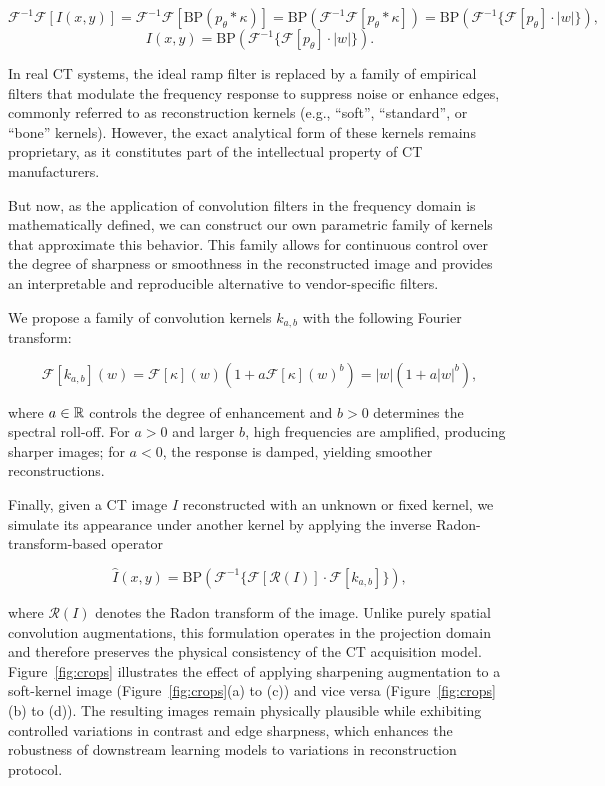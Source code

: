 \[
\mathcal{F}^{-1}\mathcal{F}[I(x, y)] = \mathcal{F}^{-1}\mathcal{F}[\text{BP}(p_\theta * \kappa)] = \text{BP}(\mathcal{F}^{-1}\mathcal{F}[p_\theta * \kappa]) = \text{BP}(\mathcal{F}^{-1}\{\mathcal{F}[p_\theta]\cdot|w|\}),\]
\[I(x, y) = \text{BP}\left(\mathcal{F}^{-1}\{\mathcal{F}[p_\theta]\cdot|w|\}\right).\]

In real CT systems, the ideal ramp filter is replaced by a family of empirical filters that modulate the frequency response to suppress noise or enhance edges, commonly referred to as reconstruction kernels (e.g., ``soft'', ``standard'', or ``bone'' kernels). However, the exact analytical form of these kernels remains proprietary, as it constitutes part of the intellectual property of CT manufacturers.

But now, as the application of convolution filters in the frequency domain is mathematically defined, we can construct our own parametric family of kernels that approximate this behavior. This family allows for continuous control over the degree of sharpness or smoothness in the reconstructed image and provides an interpretable and reproducible alternative to vendor-specific filters.

We propose a family of convolution kernels $k_{a,b}$ with the following Fourier transform:

\[\mathcal{F}[k_{a,b}](w) = \mathcal{F}[\kappa](w)(1 + a \mathcal{F}[\kappa](w)^b) = |w|(1 + a|w|^b),\]

\noindent
where $a \in \mathbb{R}$ controls the degree of enhancement and $b > 0$ determines the spectral roll-off. For $a > 0$ and larger $b$, high frequencies are amplified, producing sharper images; for $a < 0$, the response is damped, yielding smoother reconstructions.

Finally, given a CT image $I$ reconstructed with an unknown or fixed kernel, we simulate its appearance under another kernel by applying the inverse Radon-transform-based operator

\[\hat{I}(x, y) = \text{BP}\left(\mathcal{F}^{-1}\{\mathcal{F}[\mathcal{R}(I)]\cdot\mathcal{F}[k_{a,b}]\}\right),\]

\noindent
where $\mathcal{R}(I)$ denotes the Radon transform of the image. Unlike purely spatial convolution augmentations, this formulation operates in the projection domain and therefore preserves the physical consistency of the CT acquisition model. Figure~\ref{fig:crops} illustrates the effect of applying sharpening augmentation to a soft-kernel image (Figure~\ref{fig:crops}(a) to (c)) and vice versa (Figure~\ref{fig:crops}(b) to (d)). The resulting images remain physically plausible while exhibiting controlled variations in contrast and edge sharpness, which enhances the robustness of downstream learning models to variations in reconstruction protocol.

